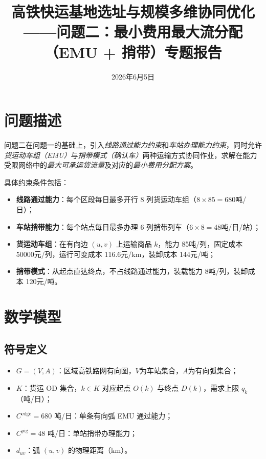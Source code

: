 \documentclass[12pt,a4paper,fontset=none]{ctexart}
\begin{document}
\title{\heiti{} 高铁快运基地选址与规模多维协同优化\\[6pt]
       \large ——问题二：最小费用最大流分配（EMU + 捎带）专题报告}
\author{}
\date{ 2026年6月5日}
\maketitle
\thispagestyle{empty}

\section{问题描述}

问题二在问题一的基础上，引入\emph{线路通过能力约束}和\emph{车站办理能力约束}，同时允许\emph{货运动车组（EMU）}与\emph{捎带模式（确认车）}两种运输方式协同作业，求解在能力受限网络中的\emph{最大可承运货流量}及对应的\emph{最小费用分配方案}。

具体约束条件包括：
\begin{itemize}[leftmargin=*]
    \item \textbf{线路通过能力}：每个区段每日最多开行 8 列货运动车组（$8 \times 85 = 680$吨/日）；
    \item \textbf{车站捎带能力}：每个站点每日最多办理 6 列捎带列车（$6 \times 8 = 48$吨/日/站）；
    \item \textbf{货运动车组}：在有向边 $(u,v)$ 上运输商品 $k$，能力 85吨/列，固定成本 50000元/列，运行可变成本 116.6元/km，装卸成本 144元/吨；
    \item \textbf{捎带模式}：从起点直达终点，不占线路通过能力，装载能力 8吨/列，装卸成本 120元/吨。
\end{itemize}

\section{数学模型}

\subsection{符号定义}

\begin{itemize}[leftmargin=*]
    \item $G = (V, A)$：区域高铁路网有向图，$V$为车站集合，$A$为有向弧集合；
    \item $K$：货运 OD 集合，$k \in K$ 对应起点 $O(k)$ 与终点 $D(k)$，需求上限 $q_k$（吨/日）；
    \item $C^{\text{edge}} = 680$ 吨/日：单条有向弧 EMU 通过能力；
    \item $C^{\text{pig}} = 48$ 吨/日：单站捎带办理能力；
    \item $d_{uv}$：弧 $(u,v)$ 的物理距离（km）。
\end{itemize}
\end{document}
